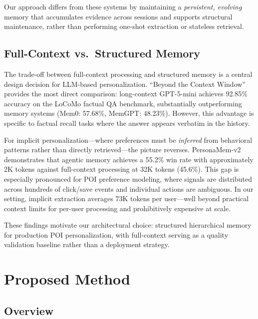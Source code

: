 \documentclass[manuscript,screen,review]{acmart}
\begin{document}
Our approach differs from these systems by maintaining a \textit{persistent, evolving} memory that accumulates evidence across sessions and supports structural maintenance, rather than performing one-shot extraction or stateless retrieval.

\subsection{Full-Context vs.\ Structured Memory}

The trade-off between full-context processing and structured memory is a central design decision for LLM-based personalization.
``Beyond the Context Window''~\cite{beyond-context-window} provides the most direct comparison: long-context GPT-5-mini achieves 92.85\% accuracy on the LoCoMo factual QA benchmark, substantially outperforming memory systems (Mem0: 57.68\%, MemGPT: 48.23\%). However, this advantage is specific to factual recall tasks where the answer appears verbatim in the history.

For implicit personalization---where preferences must be \textit{inferred} from behavioral patterns rather than directly retrieved---the picture reverses. PersonaMem-v2~\cite{personamem-v2} demonstrates that agentic memory achieves a 55.2\% win rate with approximately 2K tokens against full-context processing at 32K tokens (45.6\%). This gap is especially pronounced for POI preference modeling, where signals are distributed across hundreds of click/save events and individual actions are ambiguous. In our setting, implicit extraction averages 73K tokens per user---well beyond practical context limits for per-user processing and prohibitively expensive at scale.

These findings motivate our architectural choice: structured hierarchical memory for production POI personalization, with full-context serving as a quality validation baseline rather than a deployment strategy.


\section{Proposed Method}

\subsection{Overview}
\end{document}
